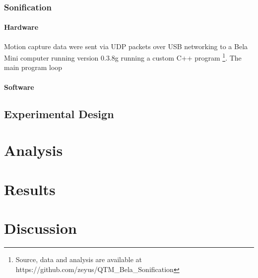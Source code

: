 \documentclass[10pt,a4paper,onecolumn]{article}
\let\oldparagraph\paragraph
\renewcommand{\paragraph}[1]{\oldparagraph{#1}\mbox{}}
\begin{document}
\hypertarget{sonification}{%
\subsubsection{Sonification}\label{sonification}}

\hypertarget{hardware}{%
\paragraph{Hardware}\label{hardware}}

Motion capture data were sent via UDP packets over USB networking to a Bela Mini computer running version 0.3.8g running a custom C++ program \footnote{Source, data and analysis are available at https://github.com/zeyus/QTM\_Bela\_Sonification}. The main program loop

\hypertarget{software}{%
\paragraph{Software}\label{software}}

\hypertarget{experimental-design}{%
\subsection{Experimental Design}\label{experimental-design}}

\hypertarget{analysis}{%
\section{Analysis}\label{analysis}}

\hypertarget{results}{%
\section{Results}\label{results}}

\hypertarget{discussion}{%
\section{Discussion}\label{discussion}}

\newpage

\printbibliography[title=References]
\end{document}
